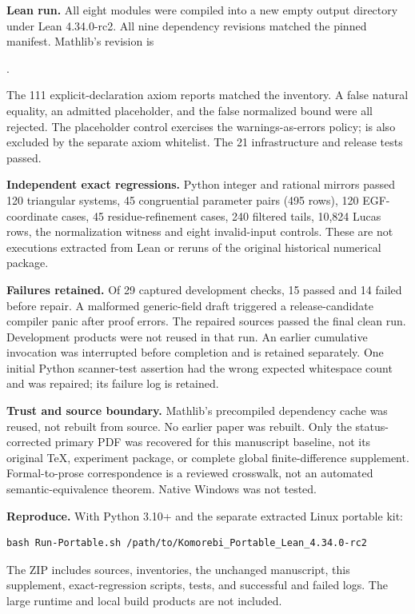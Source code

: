 \textbf{Lean run.} All eight modules were compiled into a new empty output directory under Lean 4.34.0-rc2. All nine dependency revisions matched the pinned manifest. Mathlib's revision is\par
{\footnotesize{}.}

The 111 explicit-declaration axiom reports matched the inventory. A false natural equality, an admitted placeholder, and the false normalized bound were all rejected. The placeholder control exercises the warnings-as-errors policy;  is also excluded by the separate axiom whitelist. The 21 infrastructure and release tests passed.

\textbf{Independent exact regressions.} Python integer and rational mirrors passed 120 triangular systems, 45 congruential parameter pairs (495 rows), 120 EGF-coordinate cases, 45 residue-refinement cases, 240 filtered tails, 10,824 Lucas rows, the normalization witness and eight invalid-input controls. These are not executions extracted from Lean or reruns of the original historical numerical package.

\textbf{Failures retained.} Of 29 captured development checks, 15 passed and 14 failed before repair. A malformed generic-field draft triggered a release-candidate compiler panic after proof errors. The repaired sources passed the final clean run. Development products were not reused in that run. An earlier cumulative invocation was interrupted before completion and is retained separately. One initial Python scanner-test assertion had the wrong expected whitespace count and was repaired; its failure log is retained.

\textbf{Trust and source boundary.} Mathlib's precompiled dependency cache was reused, not rebuilt from source. No earlier paper was rebuilt. Only the status-corrected primary PDF was recovered for this manuscript baseline, not its original TeX, experiment package, or complete global finite-difference supplement. Formal-to-prose correspondence is a reviewed crosswalk, not an automated semantic-equivalence theorem. Native Windows was not tested.

\textbf{Reproduce.} With Python 3.10+ and the separate extracted Linux portable kit:
\begin{verbatim}
bash Run-Portable.sh /path/to/Komorebi_Portable_Lean_4.34.0-rc2
\end{verbatim}
The ZIP includes sources, inventories, the unchanged manuscript, this supplement, exact-regression scripts, tests, and successful and failed logs. The large runtime and local build products are not included.
